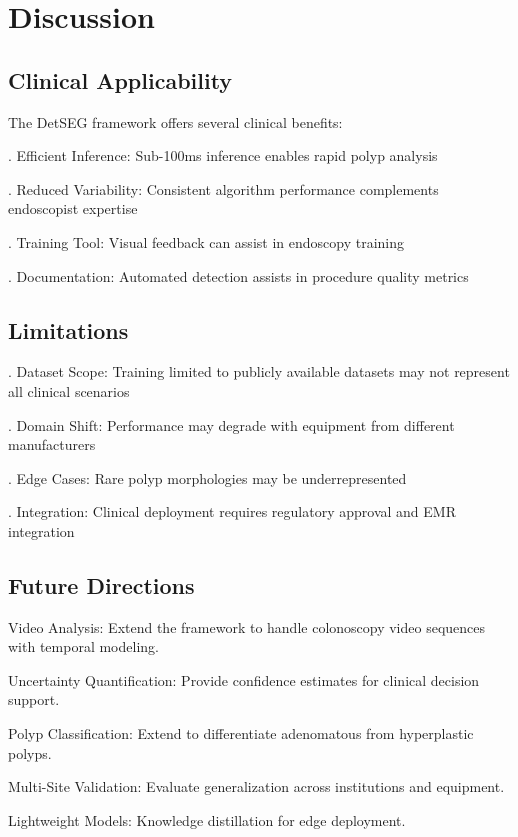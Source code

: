 \documentclass[runningheads]{llncs}
\begin{document}
\section{Discussion}

\subsection{Clinical Applicability}
The DetSEG framework offers several clinical benefits:

. Efficient Inference: Sub-100ms inference enables rapid polyp analysis

. Reduced Variability: Consistent algorithm performance complements endoscopist expertise

. Training Tool: Visual feedback can assist in endoscopy training

. Documentation: Automated detection assists in procedure quality metrics

\subsection{Limitations}

. Dataset Scope: Training limited to publicly available datasets may not represent all clinical scenarios

. Domain Shift: Performance may degrade with equipment from different manufacturers

. Edge Cases: Rare polyp morphologies may be underrepresented

. Integration: Clinical deployment requires regulatory approval and EMR integration

\subsection{Future Directions}

\noindent Video Analysis: Extend the framework to handle colonoscopy video sequences with temporal modeling.

\noindent Uncertainty Quantification: Provide confidence estimates for clinical decision support.

\noindent Polyp Classification: Extend to differentiate adenomatous from hyperplastic polyps.

\noindent Multi-Site Validation: Evaluate generalization across institutions and equipment.

\noindent Lightweight Models: Knowledge distillation for edge deployment.
\end{document}

